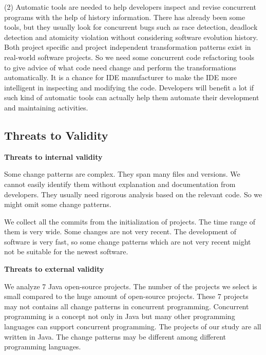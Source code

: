 (2) Automatic tools are needed to help developers inspect and revise concurrent programs with the help of history information. There has already been some tools, but they usually look for concurrent bugs such as race detection, deadlock detection and atomicity violation without considering software evolution history. Both project specific and project independent transformation patterns exist in real-world software projects. So we need some concurrent code refactoring tools to give advice of what code need change and perform the transformations automatically. It is a chance for IDE manufacturer to make the IDE more intelligent in inspecting and modifying the code. Developers will benefit a lot if such kind of automatic tools can actually help them automate their development and maintaining activities.
\subsection{Threats to Validity}

\textbf{Threats to internal validity}


Some change patterns are complex. They span many files and versions. We cannot easily identify them without explanation and documentation from developers. They usually need rigorous analysis based on the relevant code. So we might omit some change patterns.

We collect all the commits from the initialization of projects. The time range of them is very wide. Some changes are not very recent. The development of software is very fast, so some change patterns which are not very recent might not be suitable for the newest software.

\textbf{Threats to external validity}

We analyze 7 Java open-source projects. The number of the projects we select is small compared to the huge amount of open-source projects. These 7 projects may not contains all change patterns in concurrent programming. Concurrent programming is a concept not only in Java but many other programming languages can support concurrent programming. The projects of our study are all written in Java. The change patterns may be different among different programming languages. 